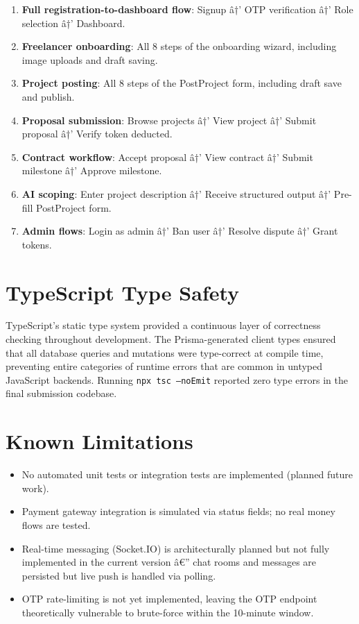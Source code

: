 \begin{enumerate}
  \item \textbf{Full registration-to-dashboard flow}: Signup â†’ OTP verification â†’ Role selection â†’ Dashboard.
  \item \textbf{Freelancer onboarding}: All 8 steps of the onboarding wizard, including image uploads and draft saving.
  \item \textbf{Project posting}: All 8 steps of the PostProject form, including draft save and publish.
  \item \textbf{Proposal submission}: Browse projects â†’ View project â†’ Submit proposal â†’ Verify token deducted.
  \item \textbf{Contract workflow}: Accept proposal â†’ View contract â†’ Submit milestone â†’ Approve milestone.
  \item \textbf{AI scoping}: Enter project description â†’ Receive structured output â†’ Pre-fill PostProject form.
  \item \textbf{Admin flows}: Login as admin â†’ Ban user â†’ Resolve dispute â†’ Grant tokens.
\end{enumerate}

\section{TypeScript Type Safety}

TypeScript's static type system provided a continuous layer of correctness checking throughout development. The Prisma-generated client types ensured that all database queries and mutations were type-correct at compile time, preventing entire categories of runtime errors that are common in untyped JavaScript backends. Running \texttt{npx tsc --noEmit} reported zero type errors in the final submission codebase.

\section{Known Limitations}

\begin{itemize}
  \item No automated unit tests or integration tests are implemented (planned future work).
  \item Payment gateway integration is simulated via status fields; no real money flows are tested.
  \item Real-time messaging (Socket.IO) is architecturally planned but not fully implemented in the current version â€” chat rooms and messages are persisted but live push is handled via polling.
  \item OTP rate-limiting is not yet implemented, leaving the OTP endpoint theoretically vulnerable to brute-force within the 10-minute window.
\end{itemize}

